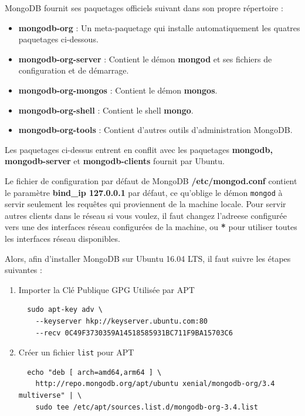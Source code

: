 \documentclass[a4paper,11pt,oneside]{report}
\begin{document}
\begin{appendices}
MongoDB fournit ses paquetages officiels suivant dans son propre répertoire :
\begin{itemize}
  \item{\textbf{mongodb-org} : Un meta-paquetage qui installe automatiquement les quatres paquetages ci-dessous.} 
  \item{\textbf{mongodb-org-server} : Contient le démon \textbf{mongod} et ses fichiers de configuration et de démarrage.} 
  \item{\textbf{mongodb-org-mongos} : Contient le démon \textbf{mongos}.} 
  \item{\textbf{mongodb-org-shell} : Contient le shell \textbf{mongo}.} 
  \item{\textbf{mongodb-org-tools} : Contient d'autres outils d'administration MongoDB.} 
  \newline
\end{itemize}


Les paquetages ci-dessus entrent en conflit avec les paquetages \textbf{mongodb, mongodb-server} et \textbf{mongodb-clients} fournit par Ubuntu. 
\newline

Le fichier de configuration par défaut de MongoDB \textbf{/etc/mongod.conf} contient le paramètre \textbf{bind\_ip 127.0.0.1} par défaut, ce qu'oblige le démon \texttt{mongod} à servir seulement les requêtes qui proviennent de la machine locale. Pour servir autres clients dans le réseau si vous voulez, il faut changez l'adreese configurée vers une des interfaces réseau configurées de la machine, ou \textbf{*} pour utiliser toutes les interfaces réseau disponibles.
\newline

Alors, afin d'installer MongoDB sur Ubuntu 16.04 LTS, il faut suivre les étapes suivantes :
\begin{enumerate}
  \item{Importer la Clé Publique GPG Utilisée par APT}
  \begin{verbatim}
  sudo apt-key adv \
    --keyserver hkp://keyserver.ubuntu.com:80 
    --recv 0C49F3730359A14518585931BC711F9BA15703C6
  \end{verbatim}

  \item{Créer un fichier \texttt{list} pour APT}
  \begin{verbatim}
  echo "deb [ arch=amd64,arm64 ] \ 
    http://repo.mongodb.org/apt/ubuntu xenial/mongodb-org/3.4 multiverse" | \ 
    sudo tee /etc/apt/sources.list.d/mongodb-org-3.4.list
  \end{verbatim}


\end{enumerate}
\end{appendices}
\end{document}
